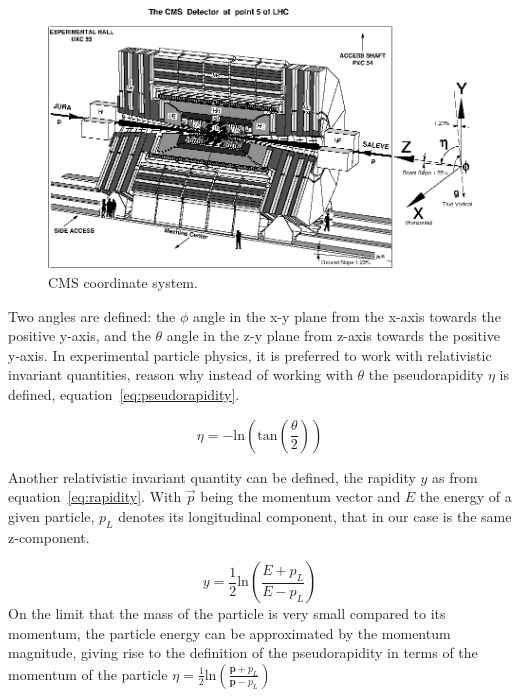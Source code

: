 \begin{figure}[!Hhtbp]
  \begin{center}
    \includegraphics[width=\textwidth]{figs/CMS_coordinates.jpg}
    \caption{CMS coordinate system. }
    \label{fig:cmscoor}
  \end{center}
\end{figure}

Two angles are defined: the $\phi$ angle in the x-y plane from the x-axis towards the positive y-axis, and the $\theta$ angle in the z-y plane from z-axis towards the positive y-axis. In experimental particle physics, it is preferred to work with relativistic invariant quantities, reason why instead of working with $\theta$ the pseudorapidity $\eta$ is defined, equation~\ref{eq:pseudorapidity}. 

\begin{equation}
  \label{eq:pseudorapidity}
  \eta = -\text{ln}\left( \text{tan}\left(\frac{\theta}{2}\right)\right)
\end{equation} 

Another relativistic invariant quantity can be defined, the rapidity $y$ as from equation~\ref{eq:rapidity}. With $\vec{p}$ being the momentum vector and $E$ the energy of a given particle, $p_{L}$ denotes its longitudinal component, that in our case is the same z-component. 

\begin{equation}
  \label{eq:rapidity}
  y=\frac{1}{2}\text{ln}\left(\frac{E+p_{L}}{E-p_{L}}\right)
\end{equation} On the limit that the mass of the particle is very small compared to its momentum, the particle energy can be approximated by the momentum magnitude, giving rise to the definition of the pseudorapidity in terms of the momentum of the particle $\eta = \frac{1}{2}\text{ln}\left(\frac{\bm{p}+p_{L}}{\bm{p}-p_{L}}\right)$

